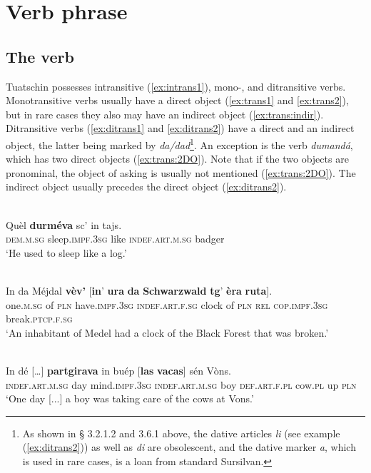 \chapter{Verb phrase}

\section{The verb}
Tuatschin possesses intransitive (\ref{ex:intrans1}), mono-, and ditransitive verbs. Monotransitive verbs usually have a direct object (\ref{ex:trans1} and \ref{ex:trans2}), but in rare cases they also may have an indirect object (\ref{ex:trans:indir}). Ditransitive verbs (\ref{ex:ditrans1} and \ref{ex:ditrans2}) have a direct and an indirect object, the latter being marked by \textit{da/dad}\footnote{As shown in § 3.2.1.2 and 3.6.1 above, the dative articles \textit{li} (see example (\ref{ex:ditrans2})) as well as \textit{di} are obsolescent, and the dative marker \textit{a}, which is used in rare cases, is a loan from standard Sursilvan.}. An exception is the verb \textit{dumandá}, which has two direct objects (\ref{ex:trans:2DO}). Note that if the two objects are pronominal, the object of asking is usually not mentioned (\ref{ex:trans:2DO}). The indirect object usually precedes the direct object (\ref{ex:ditrans2}).

\ea
\label{ex:intrans1}
\\
\gll  Quèl \textbf{durméva} sc’ in tajs.  \\
\textsc{dem.m.sg} sleep.\textsc{impf.3sg} like \textsc{indef.art.m.sg} badger\\
\glt `He used to sleep like a log.'
\z

\ea\label{ex:trans1}
\\
\gll    In da Méjdal \textbf{vèv'} [\textbf{in}' \textbf{ura} \textbf{da} \textbf{Schwarzwald} \textbf{tg}' \textbf{èra} \textbf{ruta}].\\
     one.\textsc{m.sg} of \textsc{pln} have.\textsc{impf.3sg} \textsc{indef.art.f.sg} clock of \textsc{pln} \textsc{rel} \textsc{cop.impf.3sg} break.\textsc{ptcp.f.sg}\\
\glt `An inhabitant of Medel had a clock of the Black Forest that was broken.'
\z

\ea\label{ex:trans2}
\\
\gll    In dé […] \textbf{partgirava} in buép [\textbf{las} \textbf{vacas}] sén Vòns.\\
     \textsc{indef.art.m.sg} day {} mind.\textsc{impf.3sg} \textsc{indef.art.m.sg} boy \textsc{def.art.f.pl} cow.\textsc{pl} up \textsc{pln}\\
\glt `One day [...] a boy was taking care of the cows at Vons.'
\z

